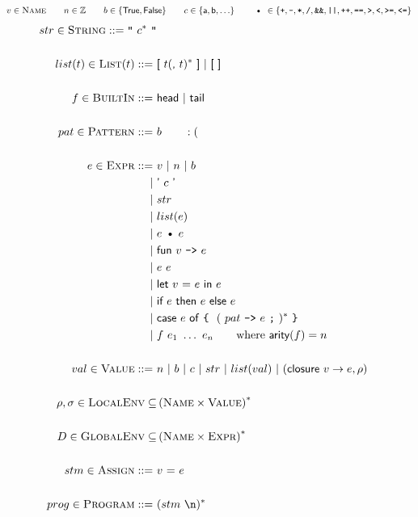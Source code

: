 \documentclass{article}
\def\code#1{\texttt{#1}}
\def\codesf#1{\textsf{#1}}
\def\por{\ | \ }
\def\binop{\ \text{\textbullet}\ }
\begin{document}
\begin{gather*}
v\in \textsc{Name} \qquad 	n\in \mathbb Z \qquad b \in \{\codesf{True},\codesf{False}\}\qquad c\in \{\codesf a, \codesf b,\ldots\}\qquad \binop\in \{\code{+},\code{-},\code{*},\code{/},\code{\&\&},\code{||},\code{++},\code{==},\code{>},\code{<},\code{>=},\code{<=}\}
\end{gather*}
\begin{align*}
str \in \textsc{String} ::= \code{"} \ c^* \ \code{"}\\\\
list(t) \in \textsc{List}(t) ::= \ & \codesf{[} \ t (\codesf{,} \ t)^* \ \codesf{]} \por \codesf{[ ]}\\\\
f \in \textsc{BuiltIn} ::= \ & \codesf{head} \por \codesf{tail}\\\\
pat \in \textsc{Pattern} ::=\ & b\qquad :(\\\\
e\in \textsc{Expr} ::= \ & v \por n \por b\\
				\por & \codesf{' $c$ '}\\
				\por & str\\
				\por & list(e)\\
				\por & e \binop e\\
				\por & \codesf{fun} \ v \ \code{->}\ e\\
				\por & e \ e\\
				\por & \codesf{let $v$ = $e$ in $e$}\\
				\por & \codesf{if $e$ then $e$ else $e$}\\
				\por & \codesf{case $e$ of \code{\char`\{} \ $($ $pat$ \code{->} $e$ \code; $)^*$ \code{\char`\}}}\\
				\por & f \ e_1 \ \ldots \ e_n \qquad \text{where $\textsf{arity}(f)=n$}\\\\
val \in \textsc{Value} ::= \ & n \por b \por c \por str \por list(val) \por  (\textsf{closure} \ v\to e,\rho)\\\\
\rho,\sigma \in \textsc{LocalEnv} \subseteq &\left(\textsc{Name}\times \textsc{Value}\right)^*\\\\
D \in \textsc{GlobalEnv} \subseteq &\left(\textsc{Name}\times \textsc{Expr}\right)^*\\\\
stm \in \textsc{Assign} ::= \ & \codesf{$v$ = $e$}\\\\
prog \in \textsc{Program} ::= \ & (stm \ \code{\char`\\n})^* \\\\
\end{align*}
\end{document}
